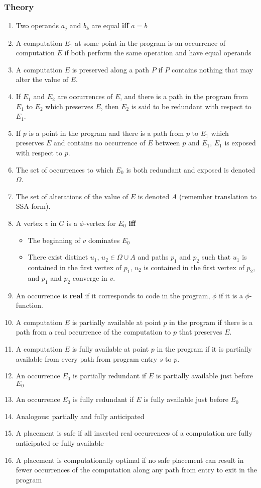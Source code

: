\documentclass[a4paper,12pt, notitlepage]{article}
\renewcommand{\iff}{\textbf{ iff }}
\begin{document}
\subsubsection*{Theory}
\begin{enumerate}
\item Two operands $a_j$ and $b_k$ are equal \iff $a = b$
\item A computation $E_1$ at some point in the program is an occurrence of
computation $E$ if both perform the same operation and have equal operands
\item A computation $E$ is preserved along a path $P$ if $P$ contains nothing
that may alter the value of $E$.
\item If $E_1$ and $E_2$ are occurrences of $E$, and there is a path in the
program from $E_1$ to $E_2$ which preserves $E$, then $E_2$ is said to be
redundant with respect to $E_1$.
\item If $p$ is a point in the program and there is a path from $p$ to $E_1$
which preserves $E$ and contains no occurrence of $E$ between $p$ and $E_1$, 
$E_1$ is exposed with respect to $p$.
\item The set of occurrences to which $E_0$ is both redundant and exposed is
denoted $\Omega$.
\item The set of alterations of the value of $E$ is denoted $A$ (remember
        translation to SSA-form).
\item A vertex $v$ in $G$ is a $\phi$-vertex for $E_0$ \iff
    \begin{itemize}
        \item The beginning of $v$ dominates $E_0$
        \item There exist distinct $u_1$, $u_2 \in \Omega \cup A$ and paths $p_1$ 
        and $p_2$ such that $u_1$ is contained in the first vertex of $p_1$, 
        $u_2$ is contained in the first vertex of $p_2$, and $p_1$ and $p_2$
        converge in $v$.
    \end{itemize}
\item An occurrence is \textbf{real} if it corresponds to code in the program,
    $\phi$ if it is a $\phi$-function.
\item A computation $E$ is partially available at point $p$ in the program if
there is a path from a real occurrence of the computation to $p$ that preserves
$E$.
\item A computation $E$ is fully available at point $p$ in the program if it is
partially available from every path from program entry $s$ to $p$.
\item An occurrence $E_0$ is partially redundant if $E$ is partially available
just before $E_0$
\item An occurrence $E_0$ is fully redundant if $E$ is fully available
just before $E_0$
\item Analogous: partially and fully anticipated
\item A placement is safe if all inserted real occurrences of a computation are
fully anticipated or fully available
\item A placement is computationally optimal if no safe placement can result in
fewer occurrences of the computation along any path from entry to exit in the
program
\end{enumerate}
\end{document}
